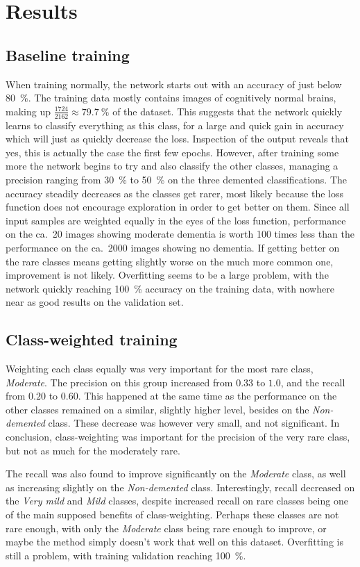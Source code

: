 \documentclass{kththesis}
\begin{document}
\section{Results}
\subsection{Baseline training}
When training normally, the network starts out with an accuracy of just below 80~\%. The training data mostly contains images of cognitively normal brains, making up $\frac{1724}{2162} \approx 79.7~\%$ of the dataset. This suggests that the network quickly learns to classify everything as this class, for a large and quick gain in accuracy which will just as quickly decrease the loss. Inspection of the output reveals that yes, this is actually the case the first few epochs. However, after training some more the network begins to try and also classify the other classes, managing a precision ranging from 30~\% to 50~\% on the three demented classifications. The accuracy steadily decreases as the classes get rarer, most likely because the loss function does not encourage exploration in order to get better on them. Since all input samples are weighted equally in the eyes of the loss function, performance on the ca.\ 20 images showing moderate dementia is worth 100 times less than the performance on the ca.\ \num{2000} images showing no dementia. If getting better on the rare classes means getting slightly worse on the much more common one, improvement is not likely. Overfitting seems to be a large problem, with the network quickly reaching 100~\% accuracy on the training data, with nowhere near as good results on the validation set.

\subsection{Class-weighted training}
Weighting each class equally was very important for the most rare class, \textit{Moderate}. The precision on this group increased from $0.33$ to $1.0$, and the recall from $0.20$ to $0.60$. This happened at the same time as the performance on the other classes remained on a similar, slightly higher level, besides on the \textit{Non-demented} class. These decrease was however very small, and not significant. In conclusion, class-weighting was important for the precision of the very rare class, but not as much for the moderately rare.

The recall was also found to improve significantly on the \textit{Moderate} class, as well as increasing slightly on the \textit{Non-demented} class. Interestingly, recall decreased on the \textit{Very mild} and \textit{Mild} classes, despite increased recall on rare classes being one of the main supposed benefits of class-weighting. Perhaps these classes are not rare enough, with only the \textit{Moderate} class being rare enough to improve, or maybe the method simply doesn't work that well on this dataset. Overfitting is still a problem, with training validation reaching 100~\%.
\end{document}
